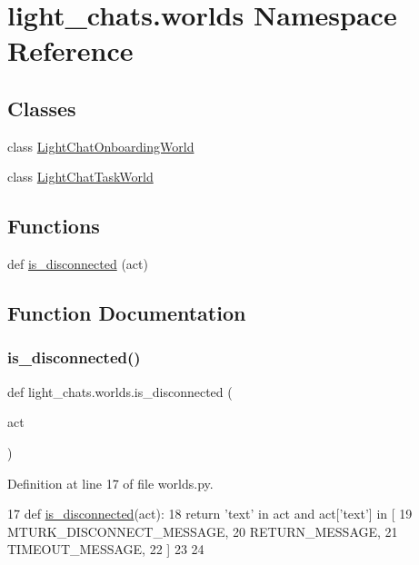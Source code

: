 \hypertarget{namespacelight__chats_1_1worlds}{}\section{light\+\_\+chats.\+worlds Namespace Reference}
\label{namespacelight__chats_1_1worlds}
\subsection*{Classes}
\begin{DoxyCompactItemize}
\item 
class \hyperlink{classlight__chats_1_1worlds_1_1LightChatOnboardingWorld}{Light\+Chat\+Onboarding\+World}
\item 
class \hyperlink{classlight__chats_1_1worlds_1_1LightChatTaskWorld}{Light\+Chat\+Task\+World}
\end{DoxyCompactItemize}
\subsection*{Functions}
\begin{DoxyCompactItemize}
\item 
def \hyperlink{namespacelight__chats_1_1worlds_a43b0aff73307cda95a089763b77f40d3}{is\+\_\+disconnected} (act)
\end{DoxyCompactItemize}


\subsection{Function Documentation}
\mbox{\label{namespacelight__chats_1_1worlds_a43b0aff73307cda95a089763b77f40d3}} 
\subsubsection{\texorpdfstring{is\+\_\+disconnected()}{is\_disconnected()}}
{\footnotesize\ttfamily def light\+\_\+chats.\+worlds.\+is\+\_\+disconnected (\begin{DoxyParamCaption}\item[{}]{act }\end{DoxyParamCaption})}



Definition at line 17 of file worlds.\+py.


\begin{DoxyCode}
17 \textcolor{keyword}{def }\hyperlink{namespacelight__chats_1_1worlds_a43b0aff73307cda95a089763b77f40d3}{is\_disconnected}(act):
18     \textcolor{keywordflow}{return} \textcolor{stringliteral}{'text'} \textcolor{keywordflow}{in} act \textcolor{keywordflow}{and} act[\textcolor{stringliteral}{'text'}] \textcolor{keywordflow}{in} [
19         MTURK\_DISCONNECT\_MESSAGE,
20         RETURN\_MESSAGE,
21         TIMEOUT\_MESSAGE,
22     ]
23 
24 
\end{DoxyCode}
